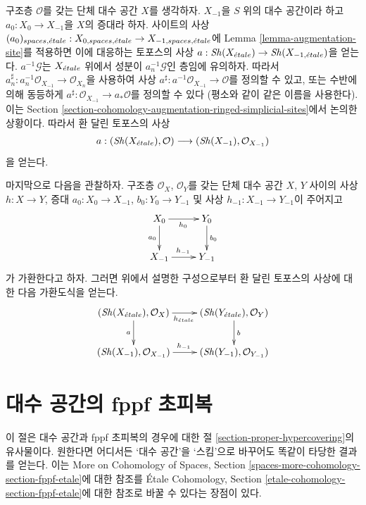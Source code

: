 \medskip\noindent
구조층 $\mathcal{O}$를 갖는 단체 대수 공간 $X$를 생각하자.
$X_{-1}$을 $S$ 위의 대수 공간이라 하고 $a_0 : X_0 \to X_{-1}$을
$X$의 증대라 하자. 사이트의 사상
$(a_0)_{spaces, {\acute{e}tale}} :
X_{0, spaces, {\acute{e}tale}} \to X_{-1, spaces, {\acute{e}tale}}$에
Lemma \ref{lemma-augmentation-site}를 적용하면 이에 대응하는 토포스의
사상 $a : \mathop{\mathit{Sh}}\nolimits(X_{\acute{e}tale}) \to \mathop{\mathit{Sh}}\nolimits(X_{-1, {\acute{e}tale}})$을 얻는다.
$a^{-1}\mathcal{G}$는 $X_{\acute{e}tale}$ 위에서 성분이
$a_n^{-1}\mathcal{G}$인 층임에 유의하자. 따라서
$a_n^\sharp : a_n^{-1}\mathcal{O}_{X_{-1}} \to \mathcal{O}_{X_n}$을
사용하여 사상 $a^\sharp : a^{-1}\mathcal{O}_{X_{-1}} \to \mathcal{O}$를
정의할 수 있고, 또는 수반에 의해 동등하게
$a^\sharp : \mathcal{O}_{X_{-1}} \to a_*\mathcal{O}$를 정의할 수 있다
(평소와 같이 같은 이름을 사용한다). 이는
Section \ref{section-cohomology-augmentation-ringed-simplicial-sites}에서
논의한 상황이다. 따라서 환 달린 토포스의 사상
$$
a :
(\mathop{\mathit{Sh}}\nolimits(X_{\acute{e}tale}), \mathcal{O})
\longrightarrow
(\mathop{\mathit{Sh}}\nolimits(X_{-1}), \mathcal{O}_{X_{-1}})
$$
을 얻는다.

\medskip\noindent
마지막으로 다음을 관찰하자. 구조층 $\mathcal{O}_X$, $\mathcal{O}_Y$를
갖는 단체 대수 공간 $X$, $Y$ 사이의 사상
$h : X \to Y$, 증대
$a_0 : X_0 \to X_{-1}$, $b_0 : Y_0 \to Y_{-1}$ 및 사상
$h_{-1} : X_{-1} \to Y_{-1}$이 주어지고
$$
\xymatrix{
X_0 \ar[r]_{h_0} \ar[d]_{a_0} & Y_0 \ar[d]^{b_0} \\
X_{-1} \ar[r]^{h_{-1}} & Y_{-1}
}
$$
가 가환한다고 하자. 그러면 위에서 설명한 구성으로부터 환 달린
토포스의 사상에 대한 다음 가환도식을 얻는다.
$$
\xymatrix{
(\Sh(X_\etale), \mathcal{O}_X) \ar[r]_{h_\etale} \ar[d]_a &
(\Sh(Y_\etale), \mathcal{O}_Y) \ar[d]^b \\
(\Sh(X_{-1}), \mathcal{O}_{X_{-1}}) \ar[r]^{h_{-1}} &
(\Sh(Y_{-1}), \mathcal{O}_{Y_{-1}})
}
$$



\section{대수 공간의 fppf 초피복}
\label{section-fppf-hypercovering}

\noindent
이 절은 대수 공간과 fppf 초피복의 경우에 대한
절 \ref{section-proper-hypercovering}의 유사물이다.
원한다면 어디서든 ‘대수 공간’을 ‘스킴’으로 바꾸어도
똑같이 타당한 결과를 얻는다. 이는
More on Cohomology of Spaces, Section
\ref{spaces-more-cohomology-section-fppf-etale}에 대한 참조를
\'Etale Cohomology, Section
\ref{etale-cohomology-section-fppf-etale}에 대한 참조로
바꿀 수 있다는 장점이 있다.

